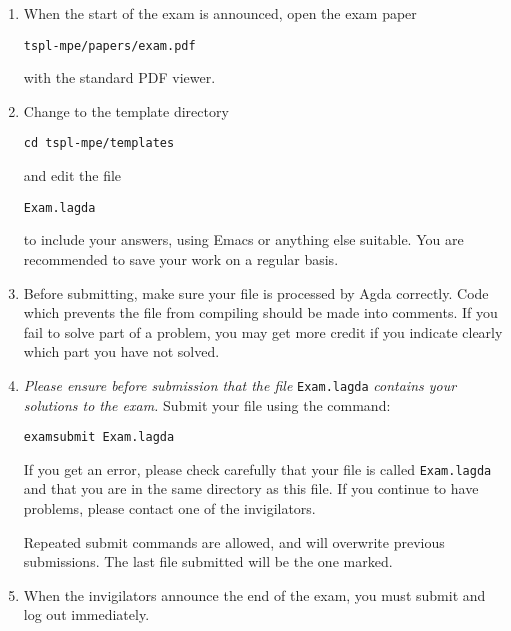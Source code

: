 \documentclass[12pt]{article}
\begin{document}
\begin{enumerate}
{\it (Note that internet access has been disabled.)}

\begin{center}
  \textbf{Do nothing further until the start of the exam is announced!}
\end{center}

\hfill \textit{Please Turn Over}
\newpage

\item When the start of the exam is announced, open the exam paper
\begin{center}
  \texttt{tspl-mpe/papers/exam.pdf}
\end{center}
with the standard PDF viewer.

\item Change to the template directory
\begin{center}
  \texttt{cd tspl-mpe/templates}
\end{center}
and edit the file
\begin{center}
  \texttt{Exam.lagda}
\end{center}
to include your answers, using Emacs or anything else suitable.
You are recommended to save your work on a regular basis.

\item Before submitting, make sure your file is processed by Agda
  correctly. Code which prevents the file from compiling should be
  made into comments. If you fail to solve part of a problem, you
  may get more credit if you indicate clearly which part you have
  not solved. 

\item \emph{Please ensure before submission that the file}
  \texttt{Exam.lagda} \emph{contains your solutions to the exam.}  Submit
  your file using the command:
  \begin{center}
  \texttt{examsubmit Exam.lagda}
  \end{center}
  If you get an error, please check carefully that your file is called
  \texttt{Exam.lagda} and that you are in the same directory as this
  file. If you continue to have problems, please contact one of the
  invigilators.
 
Repeated submit commands are allowed, and will overwrite previous
submissions.  The last file submitted will be the one marked.

\item When the invigilators announce the end of the exam, you must
  submit and log out immediately.

\end{enumerate}
\end{document}
